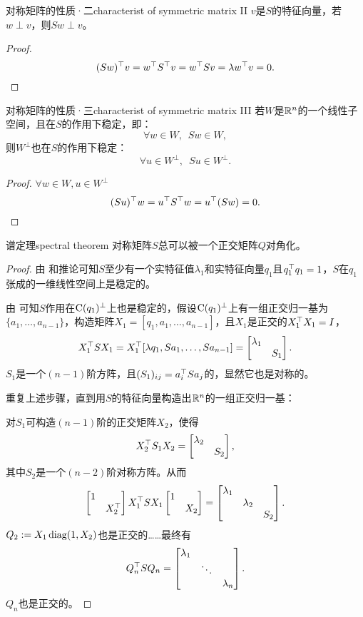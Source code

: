 \begin{theorem}{对称矩阵的性质·二}{characterist of symmetric matrix II}
	$v$是$S$的特征向量，若$w\perp v$，则$Sw\perp v$。
\end{theorem}
\begin{proof}
	
	\[
		(Sw)^\top v=w^\top S^\top v=w^\top Sv=\lambda w^\top v=0.
		\qedhere
	\]
\end{proof}
\begin{theorem}{对称矩阵的性质·三}{characterist of symmetric matrix III}
	若$W$是$\mathbb R^n$的一个线性子空间，且在$S$的作用下稳定，即：
	\[
		\forall w\in W,\enspace Sw\in W,
	\]
	则$W^\perp$也在$S$的作用下稳定：
	\[
		\forall u\in W^\perp,\enspace Su\in W^\perp.
	\]
\end{theorem}
\begin{proof}
	$\forall w\in W,u\in W^\perp$
	\[
		(Su)^\top w=u^\top S^\top w=u^\top(Sw)=0.
		\qedhere
	\]
\end{proof}
\begin{theorem}{谱定理}{spectral theorem}
	对称矩阵$S$总可以被一个正交矩阵$Q$对角化。
\end{theorem}
\begin{proof}
	由 和推论可知$S$至少有一个实特征值$\lambda_1$和实特征向量$q_1$且$q_1^\top q_1=1$，$S$在$q_1$张成的一维线性空间上是稳定的。
	
	由 可知$S$作用在$\operatorname{C}(q_1)^\perp$上也是稳定的，假设$\operatorname{C}(q_1)^\perp$上有一组正交归一基为$\{a_1,\ldots,a_{n-1}\}$，构造矩阵$X_1=[q_1,a_1,\ldots,a_{n-1}]$，且$X_1$是正交的$X_1^\top X_1=I$，
	\[
		X_1^\top SX_1=X_1^\top[\lambda q_1,Sa_1,\ldots,Sa_{n-1}]=\begin{bmatrix}
			\lambda_1\\ &S_1
		\end{bmatrix}.
	\]
	$S_1$是一个$(n-1)$阶方阵，且$(S_1)_{ij}=a_i^\top Sa_j$的，显然它也是对称的。
	
	重复上述步骤，直到用$S$的特征向量构造出$\mathbb R^n$的一组正交归一基：
	
	\noindent
	对$S_1$可构造$(n-1)$阶的正交矩阵$X_2$，使得
	\[
		X_2^\top S_1X_2=\begin{bmatrix}
			\lambda_2\\ &S_2
		\end{bmatrix},
	\]
	其中$S_2$是一个$(n-2)$阶对称方阵。从而
	\[
		\begin{bmatrix}
			1\\ &X_2^\top
		\end{bmatrix}X_1^\top SX_1\begin{bmatrix}
			1\\ &X_2
		\end{bmatrix}=\begin{bmatrix}
			\lambda_1\\ &\lambda_2\\ &&S_2
		\end{bmatrix}.
	\]
	$Q_2:=X_1\operatorname{diag}(1, X_2)$也是正交的……最终有
	\[
		Q_n^\top SQ_n=\begin{bmatrix}
			\lambda_1\\ &\ddots\\ &&\lambda_n
		\end{bmatrix}.
	\]
	$Q_n$也是正交的。
\end{proof}
